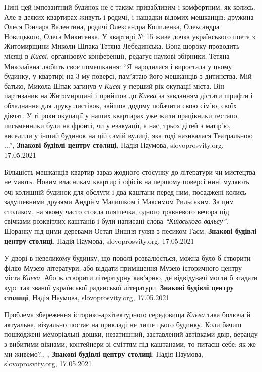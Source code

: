 Нині цей імпозантний будинок не є таким привабливим і комфортним, як колись.
Але в деяких квартирах живуть і родичі, і нащадки відомих мешканців: дружина
Олеся Гончара Валентина, родичі Олександра Копиленка, Олександра Новицького,
Олега Микитенка. У квартирі № 15 живе дочка українського поета з Житомирщини
Миколи Шпака Тетяна Лебединська. Вона щороку проводить місяці в \emph{Києві},
організовує конференції, редагує наукові збірники. Тетяна Миколаївна любить
своє помешкання: \enquote{Я народилася і виростала у цьому будинку, у квартирі на 3-му
поверсі, пам'ятаю його мешканців з дитинства. Мій батько, Микола Шпак загинув у
\emph{Києві} у перший рік окупації міста. Він партизанив на Житомирщині і прийшов до
\emph{Києва} за завданням дістати шрифти і обладнання для друку листівок, зайшов
додому побачити свою сім'ю, своїх дівчат. У ті роки окупації у наших квартирах
уже жили працівники гестапо, письменники були на фронті, чи у евакуації, а нас,
трьох дітей з матір'ю, виселили у інший будинок на цій самій вулиці, яка тоді
називалася Театральною ...},
\textbf{Знакові будівлі центру столиці}, Надія Наумова, slovoprosvity.org, 17.05.2021

Більшість мешканців квартир зараз жодного стосунку до літератури чи мистецтва
не мають. Новим власникам квартир і офісів на першому поверсі нині муляють очі
колишній будинок для обслуги і два каштани перед ним, посаджені колись
задушевними друзями Андрієм Малишком і Максимом Рильським. За цим столиком, на
якому часто стояла пляшечка, одного травневого вечора під свічками розквітлих
каштанів і були написані слова \emph{\enquote{Київського вальсу}}. Щоранку під цими деревами
Остап Вишня гуляв з песиком Гаєм,
\textbf{Знакові будівлі центру столиці}, Надія Наумова, slovoprosvity.org, 17.05.2021

У дворі в невеликому будинку, що поволі розвалюється, можна було б створити
філію Музею літератури, або віддати приміщення Музею історичного центру міста
\emph{Києва}. Або ж створити літературну кав'ярню, де відвідувачі могли б
згадати курс так званої української радянської літератури,
\textbf{Знакові будівлі центру столиці}, Надія Наумова, slovoprosvity.org, 17.05.2021

Проблема збереження історико-архітектурного середовища \emph{Києва} така болюча
й актуальна, візуально постає на прикладі не лише цього будинку. Коли бачиш
пошкоджені меморіальні дошки, незатишний, заставлений автівками двір, веранду з
вибитими вікнами, контейнери зі сміттям під каштанами, то питаєш себе: як же ми
живемо?.. ,
\textbf{Знакові будівлі центру столиці}, Надія Наумова, slovoprosvity.org, 17.05.2021

